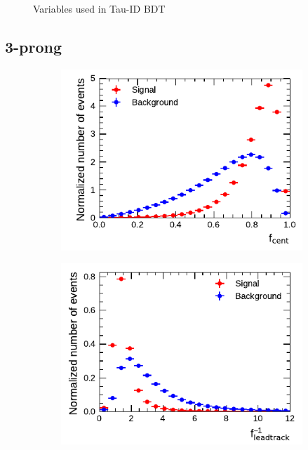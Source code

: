 \begin{figure}[!ht]
\begin{subfigure}{0.5\textwidth}
  \end{subfigure}
  \caption[]{Variables used in Tau-ID BDT}
\end{figure}

\clearpage
\subsection{3-prong}

\begin{figure}[!ht]
  \begin{subfigure}{0.5\textwidth}
    \centering
    \includegraphics{./figures/baseline_bdt_vars/3p/centFrac.pdf}
  \end{subfigure}%
  \begin{subfigure}{0.5\textwidth}
    \centering
    \includegraphics{./figures/baseline_bdt_vars/3p/etOverPtLeadTrk.pdf}
  \end{subfigure}

\end{figure}
